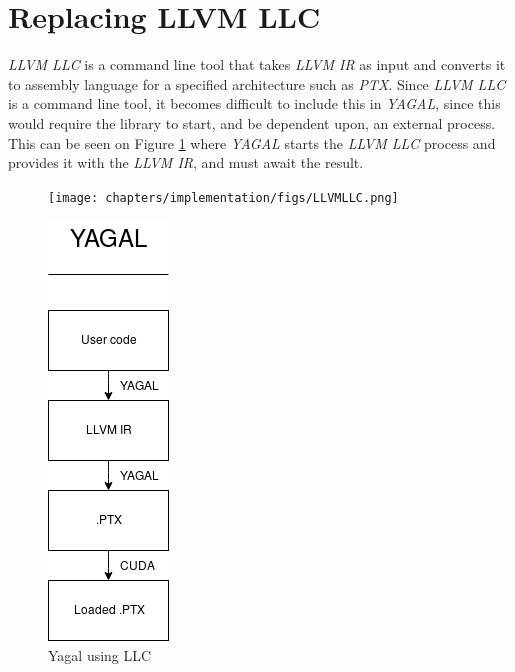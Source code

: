 \section{Replacing LLVM LLC}
\textit{LLVM LLC} is a command line tool that takes \textit{LLVM IR} as input and converts it to assembly language for a specified architecture such as \textit{PTX}. Since \textit{LLVM LLC} is a command line tool, it becomes difficult to include this in \textit{YAGAL}, since this would require the library to start, and be dependent upon, an external process. This can be seen on Figure \ref{fig:yagalLLC} where \textit{YAGAL} starts the \textit{LLVM LLC} process and provides it with the \textit{LLVM IR}, and must await the result.

\begin{figure}[!htb]
    \centering
    \begin{minipage}{.7\textwidth}
        \centering
        \texttt{[image: chapters/implementation/figs/LLVMLLC.png]}
        \caption{Yagal using LLC}
        \label{fig:yagalLLC}
    \end{minipage}
    \begin{minipage}{0.4\textwidth}
        \centering
        \includegraphics[width=0.5\linewidth]{chapters/implementation/figs/YAGALLLC.png}

\end{minipage}
\end{figure}
